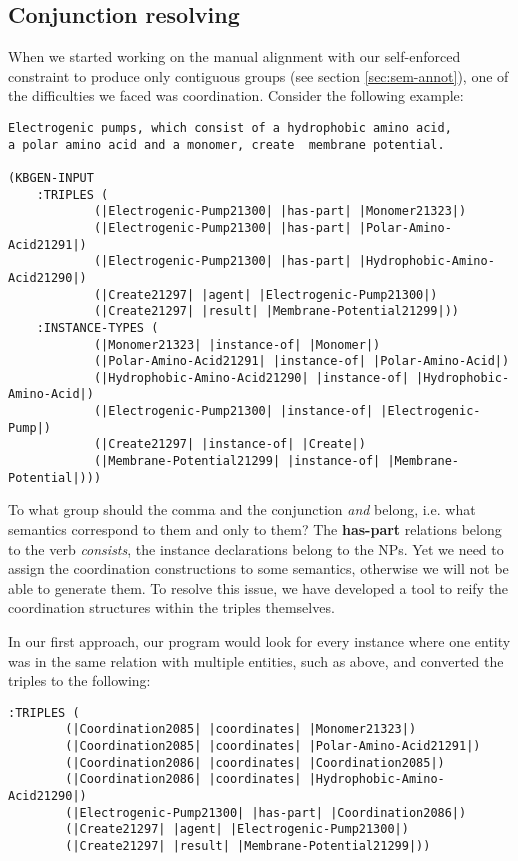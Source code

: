 \documentclass[a4paper]{article}
\begin{document}
\subsection{Conjunction resolving}

When we started working on the manual alignment with our self-enforced
constraint to produce only contiguous groups (see section
\ref{sec:sem-annot}), one of the difficulties we faced was
coordination. Consider the following example:

\begin{verbatim}
Electrogenic pumps, which consist of a hydrophobic amino acid,
a polar amino acid and a monomer, create  membrane potential.

(KBGEN-INPUT 
    :TRIPLES (
            (|Electrogenic-Pump21300| |has-part| |Monomer21323|)
            (|Electrogenic-Pump21300| |has-part| |Polar-Amino-Acid21291|)
            (|Electrogenic-Pump21300| |has-part| |Hydrophobic-Amino-Acid21290|)
            (|Create21297| |agent| |Electrogenic-Pump21300|)
            (|Create21297| |result| |Membrane-Potential21299|))
    :INSTANCE-TYPES (
            (|Monomer21323| |instance-of| |Monomer|)
            (|Polar-Amino-Acid21291| |instance-of| |Polar-Amino-Acid|)
            (|Hydrophobic-Amino-Acid21290| |instance-of| |Hydrophobic-Amino-Acid|)
            (|Electrogenic-Pump21300| |instance-of| |Electrogenic-Pump|)
            (|Create21297| |instance-of| |Create|)
            (|Membrane-Potential21299| |instance-of| |Membrane-Potential|)))
\end{verbatim}

To what group should the comma and the conjunction \emph{and} belong,
i.e. what semantics correspond to them and only to them? The
\textbf{has-part} relations belong to the verb \emph{consists}, the
instance declarations belong to the NPs. Yet we need to assign the
coordination constructions to some semantics, otherwise we will not be
able to generate them. To resolve this issue, we have developed a tool
to reify the coordination structures within the triples themselves.

In our first approach, our program would look for every instance where
one entity was in the same relation with multiple entities, such as
above, and converted the triples to the following:

\begin{verbatim}
:TRIPLES (
        (|Coordination2085| |coordinates| |Monomer21323|)
        (|Coordination2085| |coordinates| |Polar-Amino-Acid21291|)
        (|Coordination2086| |coordinates| |Coordination2085|)
        (|Coordination2086| |coordinates| |Hydrophobic-Amino-Acid21290|)
        (|Electrogenic-Pump21300| |has-part| |Coordination2086|)
        (|Create21297| |agent| |Electrogenic-Pump21300|)
        (|Create21297| |result| |Membrane-Potential21299|))
\end{verbatim}
\end{document}
